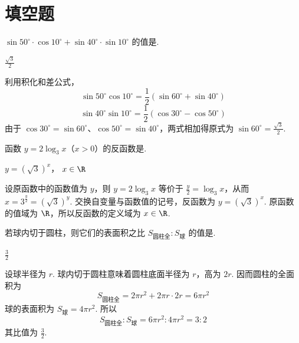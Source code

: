 \documentclass[UTF8,a4paper,oneside,11pt]{ctexbook}
\begin{document}
\section{填空题}

\begin{problem}

\(\sin 50^{\circ} \cdot \cos 10^{\circ} + \sin 40^{\circ} \cdot \sin 10^{\circ}\) 的值是\fillinblank{}.
\end{problem}

\begin{answer}
\(\frac{\sqrt{3}}{2}\)
\end{answer}

\begin{solution}
利用积化和差公式，
\[
\sin50^{\circ}\cos10^{\circ}=\frac{1}{2}\left(\sin60^{\circ}+\sin40^{\circ}\right)
\]
\[
\sin40^{\circ}\sin10^{\circ}=\frac{1}{2}\left(\cos30^{\circ}-\cos50^{\circ}\right)
\]
由于 \(\cos30^{\circ}=\sin60^{\circ}\)、\(\cos50^{\circ}=\sin40^{\circ}\)，两式相加得原式为 \(\sin60^{\circ}=\frac{\sqrt{3}}{2}\).
\end{solution}


\begin{problem}

函数 \(y = 2\log_3 x \)（\(x > 0 \)）的反函数是\fillinblank{}.
\end{problem}

\begin{answer}
\(y = (\sqrt{3})^x\)， \(x \in \R\)
\end{answer}

\begin{solution}
设原函数中的函数值为 \(y\)，则 \(y=2\log_3x\) 等价于 \(\frac{y}{2}=\log_3x\)，从而 \(x=3^{\frac{y}{2}}=(\sqrt{3})^y\). 交换自变量与函数值的记号，反函数为 \(y=(\sqrt{3})^x\). 原函数的值域为 \(\R\)，所以反函数的定义域为 \(x\in\R\).
\end{solution}


\begin{problem}

若球内切于圆柱，则它们的表面积之比 \(S_{\text{圆柱全}}: S_{\text{球}}\) 的值是\fillinblank{}.
\end{problem}

\begin{answer}
\(\frac{3}{2}\)
\end{answer}

\begin{solution}
设球半径为 \(r\). 球内切于圆柱意味着圆柱底面半径为 \(r\)，高为 \(2r\). 因而圆柱的全面积为
\[
S_{\text{圆柱全}}=2\pi r^2+2\pi r\cdot2r=6\pi r^2
\]
球的表面积为 \(S_{\text{球}}=4\pi r^2\). 所以
\[
S_{\text{圆柱全}}:S_{\text{球}}=6\pi r^2:4\pi r^2=3:2
\]
其比值为 \(\frac{3}{2}\).
\end{solution}
\end{document}
